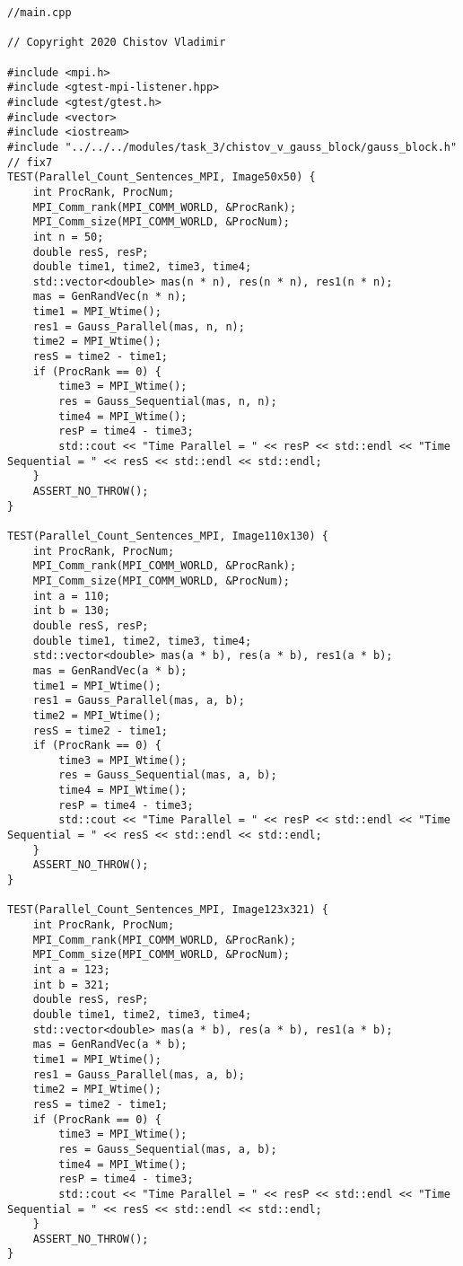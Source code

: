 \documentclass{report}
\begin{document}
\begin{lstlisting}
//main.cpp

// Copyright 2020 Chistov Vladimir

#include <mpi.h>
#include <gtest-mpi-listener.hpp>
#include <gtest/gtest.h>
#include <vector>
#include <iostream>
#include "../../../modules/task_3/chistov_v_gauss_block/gauss_block.h"
// fix7
TEST(Parallel_Count_Sentences_MPI, Image50x50) {
    int ProcRank, ProcNum;
    MPI_Comm_rank(MPI_COMM_WORLD, &ProcRank);
    MPI_Comm_size(MPI_COMM_WORLD, &ProcNum);
    int n = 50;
    double resS, resP;
    double time1, time2, time3, time4;
    std::vector<double> mas(n * n), res(n * n), res1(n * n);
    mas = GenRandVec(n * n);
    time1 = MPI_Wtime();
    res1 = Gauss_Parallel(mas, n, n);
    time2 = MPI_Wtime();
    resS = time2 - time1;
    if (ProcRank == 0) {
        time3 = MPI_Wtime();
        res = Gauss_Sequential(mas, n, n);
        time4 = MPI_Wtime();
        resP = time4 - time3;
        std::cout << "Time Parallel = " << resP << std::endl << "Time Sequential = " << resS << std::endl << std::endl;
    }
    ASSERT_NO_THROW();
}

TEST(Parallel_Count_Sentences_MPI, Image110x130) {
    int ProcRank, ProcNum;
    MPI_Comm_rank(MPI_COMM_WORLD, &ProcRank);
    MPI_Comm_size(MPI_COMM_WORLD, &ProcNum);
    int a = 110;
    int b = 130;
    double resS, resP;
    double time1, time2, time3, time4;
    std::vector<double> mas(a * b), res(a * b), res1(a * b);
    mas = GenRandVec(a * b);
    time1 = MPI_Wtime();
    res1 = Gauss_Parallel(mas, a, b);
    time2 = MPI_Wtime();
    resS = time2 - time1;
    if (ProcRank == 0) {
        time3 = MPI_Wtime();
        res = Gauss_Sequential(mas, a, b);
        time4 = MPI_Wtime();
        resP = time4 - time3;
        std::cout << "Time Parallel = " << resP << std::endl << "Time Sequential = " << resS << std::endl << std::endl;
    }
    ASSERT_NO_THROW();
}

TEST(Parallel_Count_Sentences_MPI, Image123x321) {
    int ProcRank, ProcNum;
    MPI_Comm_rank(MPI_COMM_WORLD, &ProcRank);
    MPI_Comm_size(MPI_COMM_WORLD, &ProcNum);
    int a = 123;
    int b = 321;
    double resS, resP;
    double time1, time2, time3, time4;
    std::vector<double> mas(a * b), res(a * b), res1(a * b);
    mas = GenRandVec(a * b);
    time1 = MPI_Wtime();
    res1 = Gauss_Parallel(mas, a, b);
    time2 = MPI_Wtime();
    resS = time2 - time1;
    if (ProcRank == 0) {
        time3 = MPI_Wtime();
        res = Gauss_Sequential(mas, a, b);
        time4 = MPI_Wtime();
        resP = time4 - time3;
        std::cout << "Time Parallel = " << resP << std::endl << "Time Sequential = " << resS << std::endl << std::endl;
    }
    ASSERT_NO_THROW();
}


\end{lstlisting}
\end{document}
